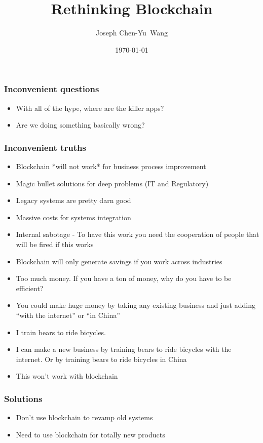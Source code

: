 \documentclass{beamer}
\title {Rethinking Blockchain}
\author{Joseph Chen-Yu~Wang}
\institute{Bitquant Research Laboratories (Asia) Limited}
\date{\today}
\begin{document}
\frame{\titlepage}
\begin{frame}
  \frametitle{Inconvenient questions}
  \begin{itemize}
  \item With all of the hype, where are the killer apps?
  \item Are we doing something basically wrong?
    \end{itemize}
\end{frame}
\begin{frame}
  \frametitle{Inconvenient truths}
  \begin{itemize}
  \item Blockchain *will not work* for business process improvement
  \item Magic bullet solutions for deep problems (IT and Regulatory)
  \item Legacy systems are pretty darn good
  \item Massive costs for systems integration
  \item Internal sabotage - To have this work you need the
    cooperation of people that will be fired if this works
  \item Blockchain will only generate savings if you work across
    industries
  \item Too much money.  If you have a ton of money, why do you have
    to be efficient?
  \end{itemize}
\end{frame}
\begin{frame}
  \begin{itemize}
    \item You could make huge money by taking any existing
      business and just adding ``with the internet'' or ``in China''
    \item I train bears to ride bicycles.
    \item I can make a new business by training bears to ride bicycles
      with the internet.  Or by training bears to ride bicycles in
      China
    \item This won't work with blockchain
  \end{itemize}
\end{frame}
\begin{frame}
  \frametitle{Solutions}
  \begin{itemize}
  \item Don't use blockchain to revamp old systems
  \item Need to use blockchain for totally new products
  \end{itemize}
\end{frame}
\end{document}
